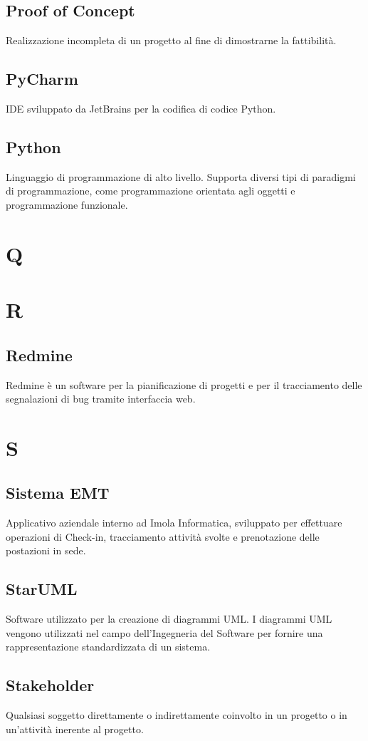 \subsection{Proof of Concept}
Realizzazione incompleta di un progetto al fine di dimostrarne la fattibilità.
\subsection{PyCharm}
IDE sviluppato da JetBrains per la codifica di codice Python.
\subsection{Python}
Linguaggio di programmazione di alto livello. Supporta diversi tipi di paradigmi di programmazione, come programmazione
orientata agli oggetti e programmazione funzionale.
\newpage
\section{Q}
\section{R}
\subsection{Redmine}
Redmine è un software per la pianificazione di progetti e per il tracciamento delle segnalazioni di bug tramite interfaccia web.
\newpage
\section{S}
\subsection{Sistema EMT}
Applicativo aziendale interno ad Imola Informatica, sviluppato per effettuare operazioni di Check-in, tracciamento attività svolte e prenotazione delle postazioni in sede.
\subsection{StarUML}
Software utilizzato per la creazione di diagrammi UML. I diagrammi UML vengono utilizzati nel campo dell'Ingegneria del Software per fornire una rappresentazione standardizzata di un sistema.
\subsection{Stakeholder}
Qualsiasi soggetto direttamente o indirettamente coinvolto in un progetto o in un'attività inerente al progetto.
\newpage
